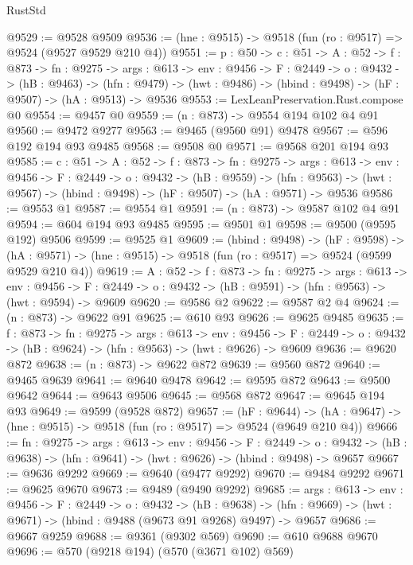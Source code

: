 \begin{lexlean}{RustStd}
\begin{coremodule}
@9529 := @9528 @9509
@9536 := (hne : @9515) -> @9518 (fun (ro : @9517) => @9524 (@9527 @9529 @210 @4))
@9551 := {p : @50} ->
  {c : @51} ->
  {A : @52} ->
  {f : @873} ->
  {fn : @9275} ->
  {args : @613} ->
  {env : @9456} ->
  {F : @2449} ->
  {o : @9432} ->
  (hB : @9463) ->
  (hfn : @9479) -> (hwt : @9486) -> (hbind : @9498) -> (hF : @9507) -> (hA : @9513) -> @9536
@9553 := LexLeanPreservation.Rust.compose @0
@9554 := @9457 @0
@9559 := (n : @873) -> @9554 @194 @102 @4 @91
@9560 := @9472 @9277
@9563 := @9465 (@9560 @91) @9478
@9567 := @596 @192 @194 @93 @9485
@9568 := @9508 @0
@9571 := @9568 @201 @194 @93
@9585 := {c : @51} ->
  {A : @52} ->
  {f : @873} ->
  {fn : @9275} ->
  {args : @613} ->
  {env : @9456} ->
  {F : @2449} ->
  {o : @9432} ->
  (hB : @9559) ->
  (hfn : @9563) -> (hwt : @9567) -> (hbind : @9498) -> (hF : @9507) -> (hA : @9571) -> @9536
@9586 := @9553 @1
@9587 := @9554 @1
@9591 := (n : @873) -> @9587 @102 @4 @91
@9594 := @604 @194 @93 @9485
@9595 := @9501 @1
@9598 := @9500 (@9595 @192) @9506
@9599 := @9525 @1
@9609 := (hbind : @9498) ->
  (hF : @9598) ->
  (hA : @9571) -> (hne : @9515) -> @9518 (fun (ro : @9517) => @9524 (@9599 @9529 @210 @4))
@9619 := {A : @52} ->
  {f : @873} ->
  {fn : @9275} ->
  {args : @613} ->
  {env : @9456} ->
  {F : @2449} -> {o : @9432} -> (hB : @9591) -> (hfn : @9563) -> (hwt : @9594) -> @9609
@9620 := @9586 @2
@9622 := @9587 @2 @4
@9624 := (n : @873) -> @9622 @91
@9625 := @610 @93
@9626 := @9625 @9485
@9635 := {f : @873} ->
  {fn : @9275} ->
  {args : @613} ->
  {env : @9456} ->
  {F : @2449} -> {o : @9432} -> (hB : @9624) -> (hfn : @9563) -> (hwt : @9626) -> @9609
@9636 := @9620 @872
@9638 := (n : @873) -> @9622 @872
@9639 := @9560 @872
@9640 := @9465 @9639
@9641 := @9640 @9478
@9642 := @9595 @872
@9643 := @9500 @9642
@9644 := @9643 @9506
@9645 := @9568 @872
@9647 := @9645 @194 @93
@9649 := @9599 (@9528 @872)
@9657 := (hF : @9644) ->
  (hA : @9647) -> (hne : @9515) -> @9518 (fun (ro : @9517) => @9524 (@9649 @210 @4))
@9666 := {fn : @9275} ->
  {args : @613} ->
  {env : @9456} ->
  {F : @2449} ->
  {o : @9432} -> (hB : @9638) -> (hfn : @9641) -> (hwt : @9626) -> (hbind : @9498) -> @9657
@9667 := @9636 @9292
@9669 := @9640 (@9477 @9292)
@9670 := @9484 @9292
@9671 := @9625 @9670
@9673 := @9489 (@9490 @9292)
@9685 := {args : @613} ->
  {env : @9456} ->
  {F : @2449} ->
  {o : @9432} ->
  (hB : @9638) -> (hfn : @9669) -> (hwt : @9671) -> (hbind : @9488 (@9673 @91 @9268) @9497) -> @9657
@9686 := @9667 @9259
@9688 := @9361 (@9302 @569)
@9690 := @610 @9688 @9670
@9696 := @570 (@9218 @194) (@570 (@3671 @102) @569)

\end{coremodule}
\end{lexlean}
